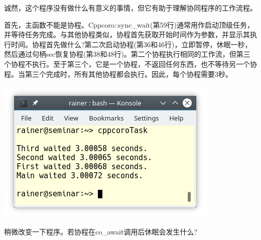 诚然，这个程序没有做什么有意义的事情，但它有助于理解协同程序的工作流程。

首先，主函数不能是协程。Cppcoro::sync\_wait(第59行)通常用作启动顶级任务，并等待任务完成。与其他协程类似，协程首先获取开始时间作为参数，并显示其执行时间。协程首先做什么?第二次启动协程(第36和46行)，立即暂停，休眠一秒，然后通过句柄sec恢复协程(第38和48行)。第二个协程执行相同的工作流，但第三个协程不执行。至于第三个，它是一个协程，不返回任何东西，也不等待另一个协程。当第三个完成时，所有其他协程都会执行。因此，每个协程需要3秒。

\begin{center}
\includegraphics[width=0.8\textwidth]{content/5/chapter8/images/1.png}\\
\end{center}

稍微改变一下程序。若协程在co\_await调用后休眠会发生什么?


